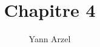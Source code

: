 \documentclass{article}
\begin{document}
\title{Chapitre 4}
\author{Yann Arzel}

\maketitle
	

\end{document}
